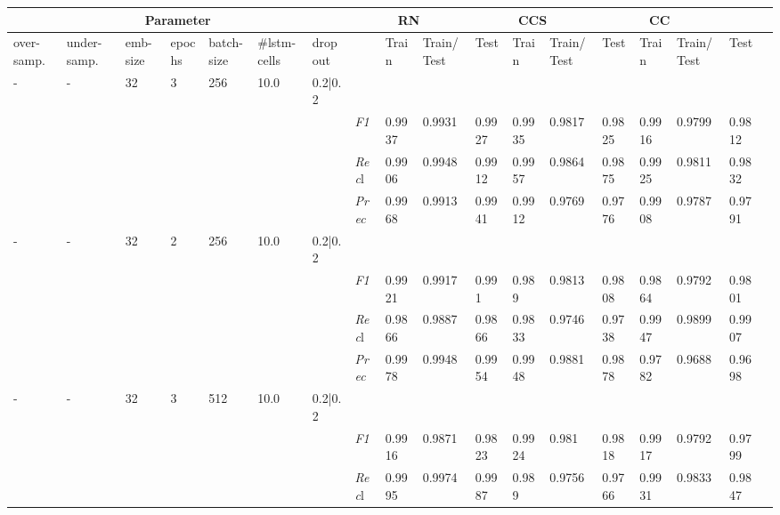     \begin{table}[]
    \tiny
    \tabcolsep=0.11cm
    \begin{tabularx}{\textwidth}{XXXXXXX|X|XXX|XXX|XXXX}
    \toprule
    \multicolumn{7}{c}{Parameter} & \multicolumn{3}{c}{RN} & \multicolumn{3}{c}{CCS} & \multicolumn{3}{c}{CC} \\ \midrule
    over-\newline samp. & under-\newline samp. & emb-\newline size & epochs &batch-\newline size & \#lstm-\newline cells & dropout & & Train & Train/\newline Test & Test & Train & Train/\newline Test & Test & Train & Train/\newline Test & Test \\ \midrule
    - & - & 32 & 3 & 256 &10.0 & 0.2|0.2 & & & & & & & & & \\
    & & & & & & & \textit{F1} & 0.9937 & 0.9931 & 0.9927 & 0.9935 & 0.9817        & 0.9825        & 0.9916        & 0.9799        & 0.9812        \\
    & & & & & & & \textit{Rec}l & 0.9906 & 0.9948 & 0.9912    & 0.9957 & 0.9864    & 0.9875    & 0.9925    & 0.9811    & 0.9832    \\
    & & & & & & & \textit{Prec} & 0.9968 & 0.9913 & 0.9941 & 0.9912 & 0.9769 & 0.9776 & 0.9908 & 0.9787 & 0.9791 \\ \midrule
    - & - & 32 & 2 & 256 &10.0 & 0.2|0.2 & & & & & & & & & \\
    & & & & & & & \textit{F1} & 0.9921 & 0.9917 & 0.991 & 0.989 & 0.9813        & 0.9808        & 0.9864        & 0.9792        & 0.9801        \\
    & & & & & & & \textit{Rec}l & 0.9866 & 0.9887 & 0.9866    & 0.9833 & 0.9746    & 0.9738    & 0.9947    & 0.9899    & 0.9907    \\
    & & & & & & & \textit{Prec} & 0.9978 & 0.9948 & 0.9954 & 0.9948 & 0.9881 & 0.9878 & 0.9782 & 0.9688 & 0.9698 \\ \midrule
    - & - & 32 & 3 & 512 &10.0 & 0.2|0.2 & & & & & & & & & \\
    & & & & & & & \textit{F1} & 0.9916 & 0.9871 & 0.9823 & 0.9924 & 0.981        & 0.9818        & 0.9917        & 0.9792        & 0.9799        \\
    & & & & & & & \textit{Rec}l & 0.9995 & 0.9974 & 0.9987    & 0.989 & 0.9756    & 0.9766    & 0.9931    & 0.9833    & 0.9847    \\

\end{tabularx}
\end{table}
